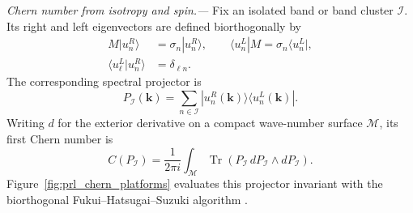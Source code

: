 \documentclass[aps,prl,reprint,superscriptaddress,nofootinbib,floatfix]{revtex4-2}
\begin{document}
\emph{Chern number from isotropy and spin.---}
Fix an isolated band or band cluster $\mathcal I$. Its right and left eigenvectors are defined biorthogonally by
\begin{equation}
  \begin{aligned}
  M|u_n^R\rangle&=\sigma_n|u_n^R\rangle,\qquad
  \langle u_n^L|M=\sigma_n\langle u_n^L|,\\
  \langle u_\ell^L|u_n^R\rangle&=\delta_{\ell n}.
  \end{aligned}
  \label{eq:prl_biorthogonal}
\end{equation}
The corresponding spectral projector is
\begin{equation}
  P_{\mathcal I}(\mathbf k)=
  \sum_{n\in\mathcal I}|u_n^R(\mathbf k)\rangle
  \langle u_n^L(\mathbf k)| .
  \label{eq:prl_projector}
\end{equation}
Writing $d$ for the exterior derivative on a compact wave-number surface $\mathcal M$, its first Chern number is
\begin{equation}
  C(P_{\mathcal I})=\frac{1}{2\pi i}\int_{\mathcal M}
  \operatorname{Tr}\!\left(P_{\mathcal I}\,dP_{\mathcal I}
  \wedge dP_{\mathcal I}\right).
  \label{eq:prl_chern}
\end{equation}
Figure~\ref{fig:prl_chern_platforms} evaluates this projector invariant with the biorthogonal Fukui--Hatsugai--Suzuki algorithm \cite{Fukui2005}.
\end{document}
